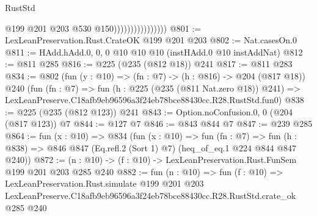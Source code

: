 \begin{lexlean}{RustStd}
\begin{coremodule}
                                    @199
                                    @201
                                    @203
                                    @530
                                    @150))))))))))))))))
@801 := LexLeanPreservation.Rust.CrateOK @199 @201 @203
@802 := Nat.casesOn.{0}
@811 := HAdd.hAdd.{0, 0, 0} @10 @10 @10 (instHAdd.{0} @10 instAddNat)
@812 := @811 @285
@816 := @225 (@235 (@812 @18)) @241
@817 := @811 @283
@834 := @802
    (fun (y : @10) => (fn : @7) -> (h : @816) -> @204 (@817 @18))
    @240
    (fun (fn : @7) =>
    fun (h : @225 (@235 (@811 Nat.zero @18)) @241) =>
    LexLeanPreserve.C18afb9eb96596a3f24eb78bce88430cc.R28.RustStd.fun0)
@838 := @225 (@235 (@812 @123)) @241
@843 := Option.noConfusion.{0, 0} (@204 (@817 @123)) @7
@844 := @127 @7
@846 := @843 @844 @7
@847 := @239 @285
@864 := fun (x : @10) =>
  @834
    (fun (x : @10) =>
    fun (fn : @7) =>
    fun (h : @838) => @846 @847 (Eq.refl.{2} (Sort 1) @7) (heq_of_eq.{1} @224 @844 @847 @240))
@872 := (n : @10) -> (f : @10) -> LexLeanPreservation.Rust.FunSem @199 @201 @203 @285 @240
@882 := fun (n : @10) =>
  fun (f : @10) =>
  LexLeanPreservation.Rust.simulate
    @199
    @201
    @203
    LexLeanPreserve.C18afb9eb96596a3f24eb78bce88430cc.R28.RustStd.crate_ok
    @285
    @240
\end{coremodule}
\end{lexlean}
